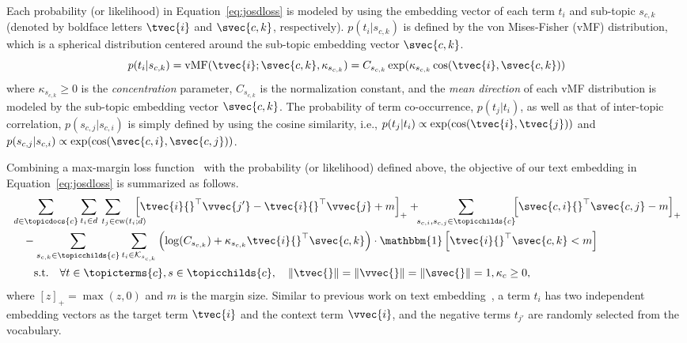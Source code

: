 Each probability (or likelihood) in Equation~\eqref{eq:josdloss} is modeled by using the embedding vector of each term $t_i$ and sub-topic $s_{c,k}$ (denoted by boldface letters $\tvec{i}$ and $\svec{c,k}$, respectively).
$p(t_i|s_{c,k})$ is defined by the von Mises-Fisher (vMF) distribution, which is a spherical distribution centered around the sub-topic embedding vector $\svec{c, k}$.
\begin{equation}
\label{eq:vmf}
    p(t_i|s_{c,k}) = \text{vMF}(\tvec{i};\svec{c,k},\kappa_{s_{c,k}}) = C_{s_{c,k}}\exp(\kappa_{s_{c,k}}\cos(\tvec{i}, \svec{c,k}))
\end{equation}
where $\kappa_{s_{c,k}}\geq 0$ is the \textit{concentration} parameter, $C_{s_{c,k}}$ is the normalization constant, and the \textit{mean direction} of each vMF distribution is modeled by the sub-topic embedding vector $\svec{c,k}$.
The probability of term co-occurrence, $p(t_j|t_i)$, as well as that of inter-topic correlation, $p(s_{c,j}|s_{c,i})$ is simply defined by using the cosine similarity, %
i.e., $p(t_j|t_i)\propto\exp(\cos(\tvec{i},\tvec{j}))$ and $p(s_{c,j}|s_{c,i})\propto\exp(\cos(\svec{c,i},\svec{c,j}))$.

Combining a max-margin loss function~\cite{vilnis2015word, vendrov2016order, ganea2018hyperbolic, meng2019spherical} with the probability (or likelihood) defined above, the objective of our text embedding in Equation~\eqref{eq:josdloss} is summarized as follows.
\begin{equation}
\label{eq:josdopt}
\begin{split}
    &\sum_{d\in\topicdocs{c}} \sum_{t_i\in d}\hspace{-18pt} \sum_{\qquad t_j\in\text{cw}(t_i;d)} \hspace{-12pt}  \left[\tvec{i}{}^\top\vvec{j'} - \tvec{i}{}^\top\vvec{j} + m \right]_+ + \hspace{-4pt}\sum_{s_{c,i},s_{c,j}\in\topicchilds{c}}\hspace{-4pt}\left[\svec{c,i}{}^\top\svec{c,j} - m\right]_+ \\
    &\quad - \sum_{s_{c,k}\in\topicchilds{c}}\sum_{t_i\in\mathcal{K}_{s_{c,k}}} \left(\log(C_{s_{c,k}}) + \kappa_{s_{c,k}}\tvec{i}{}^\top\svec{c,k}\right) \cdot \mathbbm{1}\left[\tvec{i}{}^\top\svec{c,k} < m\right]\\
    &\qquad \text{s.t.}\quad \forall t\in\topicterms{c}, s\in\topicchilds{c}, \quad \lVert\tvec{ }\rVert=\lVert\vvec{ }\rVert=\lVert\svec{ }\rVert=1, \kappa_c \geq 0,
\end{split}
\raisetag{12pt}
\end{equation}
where $[z]_+=\max(z,0)$ and $m$ is the margin size.
Similar to previous work on text embedding~\cite{mikolov2013distributed, pennington2014glove}, a term $t_i$ has two independent embedding vectors as the target term $\tvec{i}$ and the context term $\vvec{i}$, and the negative terms $t_{j'}$ are randomly selected from the vocabulary.

